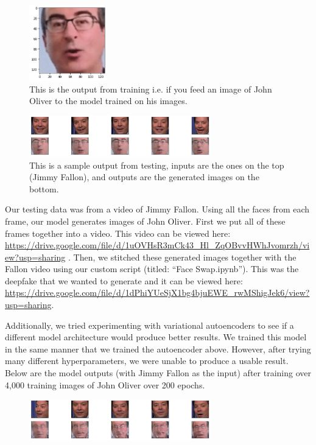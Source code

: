 \documentclass{article}
\begin{document}
\begin{figure}[!htbp]
\caption{
This is the output from training i.e. if you feed an image of John Oliver to the model trained on his images.}
\centering
\includegraphics[width=0.3\textwidth]{Johnnyoliver.png}
\end{figure}

\begin{figure}[!htbp]
\caption{
This is a sample output from testing, inputs are the ones on the top (Jimmy Fallon), and outputs are the generated images on the bottom.}
\centering
\includegraphics[width=0.7\textwidth]{GRID.png}
\end{figure}


Our testing data was from a video of Jimmy Fallon. Using all the faces from each frame, our model generates images of John Oliver. First we put all of these frames together into a video. This video can be viewed here: \url{https://drive.google.com/file/d/1uOVHsR3mCk43_Hl_ZqOBvvHWhJvomrzh/view?usp=sharing} . Then, we stitched these generated images together with the Fallon video using our custom script (titled: “Face Swap.ipynb”). This was the deepfake that we wanted to generate and it can be viewed here: \url{https://drive.google.com/file/d/1dPhiYUeSjX1bg4bjuEWE_rwMShigJek6/view?usp=sharing}.

Additionally, we tried experimenting with variational autoencoders to see if a different model architecture would produce better results. We trained this model in the same manner that we trained the autoencoder above. However, after trying many different hyperparameters, we were unable to produce a usable result. Below are the model outputs (with Jimmy Fallon as the input) after training over 4,000 training images of John Oliver over 200 epochs.

\begin{figure}[!htbp]
\centering
\includegraphics[width=0.7\textwidth]{Grid2.png}
\end{figure}
\end{document}
